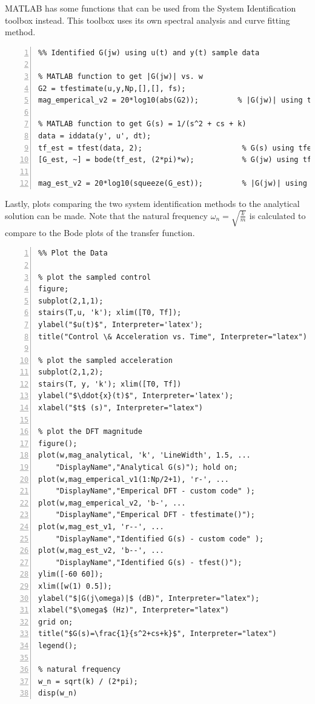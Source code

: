 \documentclass{article}
\begin{document}
MATLAB has some functions that can be used from the System Identification toolbox instead. This toolbox uses its own spectral analysis and curve fitting method.
\begin{lstlisting}[style=Matlab-editor, caption={\texttt{System Identification, Method 2}},frame=single, numbers=left]
%%%%%%%%%%%%%%%%%%%%%%%%%%%%%%%%%%%%%%%%%%%%%%%%%%%%%%%%%%%%%%%%%%%%%%%
%% Identified G(jw) using u(t) and y(t) sample data

% MATLAB function to get |G(jw)| vs. w 
G2 = tfestimate(u,y,Np,[],[], fs);
mag_emperical_v2 = 20*log10(abs(G2));         % |G(jw)| using tfestimate()

% MATLAB function to get G(s) = 1/(s^2 + cs + k)
data = iddata(y', u', dt);
tf_est = tfest(data, 2);                       % G(s) using tfest()
[G_est, ~] = bode(tf_est, (2*pi)*w);           % G(jw) using tfest()

mag_est_v2 = 20*log10(squeeze(G_est));         % |G(jw)| using tfest()
\end{lstlisting}

Lastly, plots comparing the two system identification methods to the analytical solution can be made. Note that the natural frequency $\omega_n=\sqrt{\frac{k}{m}}$ is calculated to compare to the Bode plots of the transfer function.

\begin{lstlisting}[style=Matlab-editor, caption={\texttt{Plot the Results}},frame=single, numbers=left]
%%%%%%%%%%%%%%%%%%%%%%%%%%%%%%%%%%%%%%%%%%%%%%%%%%%%%%%%%%%%%%%%%%%%
%% Plot the Data

% plot the sampled control
figure; 
subplot(2,1,1);
stairs(T,u, 'k'); xlim([T0, Tf]);
ylabel("$u(t)$", Interpreter='latex');
title("Control \& Acceleration vs. Time", Interpreter="latex")

% plot the sampled acceleration
subplot(2,1,2);
stairs(T, y, 'k'); xlim([T0, Tf])
ylabel("$\ddot{x}(t)$", Interpreter='latex');
xlabel("$t$ (s)", Interpreter="latex")

% plot the DFT magnitude
figure(); 
plot(w,mag_analytical, 'k', 'LineWidth', 1.5, ...
    "DisplayName","Analytical G(s)"); hold on;
plot(w,mag_emperical_v1(1:Np/2+1), 'r-', ...
    "DisplayName","Emperical DFT - custom code" ); 
plot(w,mag_emperical_v2, 'b-', ...
    "DisplayName","Emperical DFT - tfestimate()"); 
plot(w,mag_est_v1, 'r--', ...
    "DisplayName","Identified G(s) - custom code" );
plot(w,mag_est_v2, 'b--', ...
    "DisplayName","Identified G(s) - tfest()"); 
ylim([-60 60]); 
xlim([w(1) 0.5]);
ylabel("$|G(j\omega)|$ (dB)", Interpreter="latex");
xlabel("$\omega$ (Hz)", Interpreter="latex")
grid on; 
title("$G(s)=\frac{1}{s^2+cs+k}$", Interpreter="latex")
legend();

% natural frequency
w_n = sqrt(k) / (2*pi);
disp(w_n)
\end{lstlisting}
\end{document}
